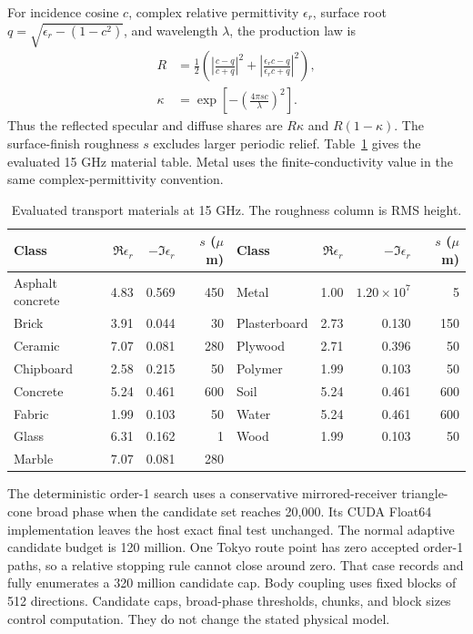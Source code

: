 For incidence cosine $c$, complex relative permittivity $\epsilon_r$, surface
root $q=\sqrt{\epsilon_r-(1-c^2)}$, and wavelength $\lambda$, the production
law is
\begin{align}
 R &= \tfrac12\left(\left|\frac{c-q}{c+q}\right|^2+
 \left|\frac{\epsilon_r c-q}{\epsilon_r c+q}\right|^2\right), \\
 \kappa &= \exp\!\left[-\left(\frac{4\pi s c}{\lambda}\right)^2\right].
\end{align}
Thus the reflected specular and diffuse shares are $R\kappa$ and
$R(1-\kappa)$. The surface-finish roughness $s$ excludes larger periodic relief.
Table~\ref{tab:si-materials} gives the evaluated 15 GHz material table. Metal
uses the finite-conductivity value in the same complex-permittivity convention.

\begin{table}[!t]
  \caption{Evaluated transport materials at 15 GHz. The roughness column is RMS height.}
  \label{tab:si-materials}
  \centering
  \begin{tabular}{lrrr@{\qquad}lrrr}
    \toprule
    Class & $\Re\epsilon_r$ & $-\Im\epsilon_r$ & $s$ ($\mu$m) & Class & $\Re\epsilon_r$ & $-\Im\epsilon_r$ & $s$ ($\mu$m) \\
    \midrule
    Asphalt concrete & 4.83 & 0.569 & 450 & Metal & 1.00 & $1.20\!\times\!10^7$ & 5 \\
    Brick & 3.91 & 0.044 & 30 & Plasterboard & 2.73 & 0.130 & 150 \\
    Ceramic & 7.07 & 0.081 & 280 & Plywood & 2.71 & 0.396 & 50 \\
    Chipboard & 2.58 & 0.215 & 50 & Polymer & 1.99 & 0.103 & 50 \\
    Concrete & 5.24 & 0.461 & 600 & Soil & 5.24 & 0.461 & 600 \\
    Fabric & 1.99 & 0.103 & 50 & Water & 5.24 & 0.461 & 600 \\
    Glass & 6.31 & 0.162 & 1 & Wood & 1.99 & 0.103 & 50 \\
    Marble & 7.07 & 0.081 & 280 & & & & \\
    \bottomrule
  \end{tabular}
\end{table}

The deterministic order-1 search uses a conservative mirrored-receiver
triangle-cone broad phase when the candidate set reaches 20,000. Its CUDA
Float64 implementation leaves the host exact final test unchanged. The normal
adaptive candidate budget is 120 million. One Tokyo route point has zero
accepted order-1 paths, so a relative stopping rule cannot close around zero.
That case records and fully enumerates a 320 million candidate cap. Body
coupling uses fixed blocks of 512 directions. Candidate caps, broad-phase
thresholds, chunks, and block sizes control computation. They do not change the
stated physical model.


